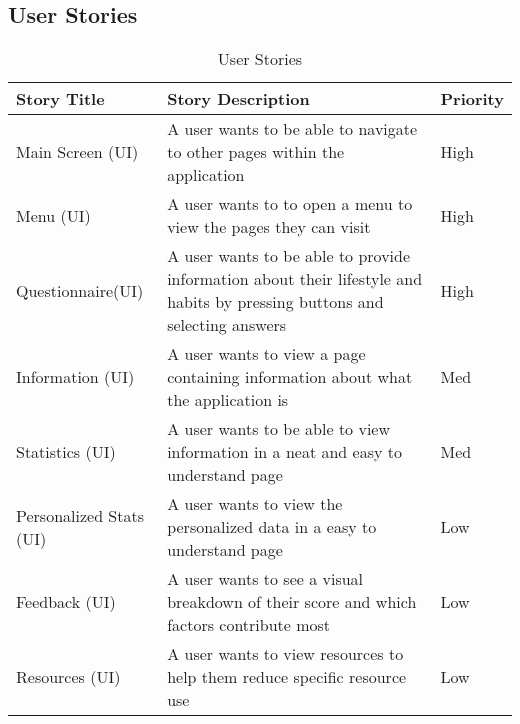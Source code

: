 \documentclass[onecolumn, draftclsnofoot,10pt, compsoc, tikz]{IEEEtran}
\begin{document}
\subsection{User Stories}

\begin{table}[h!]
\caption{User Stories}
\begin{center}
\begin{tabular}{ | m{12em} | m{7cm} | m{2cm} |}
    \hline Story Title & Story Description & Priority \\
    \hline Main Screen (UI) & A user wants to be able to navigate to other pages within the application & High\\
    \hline Menu (UI) & A user wants to to open a menu to view the pages they can visit & High \\
    \hline Questionnaire(UI) & A user wants to be able to provide information about their lifestyle and habits by pressing buttons and selecting answers & High\\
    \hline Information (UI) & A user wants to view a page containing information about what the application is & Med \\
    \hline Statistics (UI) & A user wants to be able to view information in a neat and easy to understand page & Med\\
    \hline Personalized Stats (UI) & A user wants to view the personalized data in a easy to understand page & Low \\ 
    \hline Feedback (UI) & A user wants to see a visual breakdown of their score and which factors contribute most & Low \\
    \hline Resources (UI) & A user wants to view resources to help them reduce specific resource use & Low \\
    \hline
\end{tabular}
\end{center}
\end{table}
\clearpage
\end{document}
